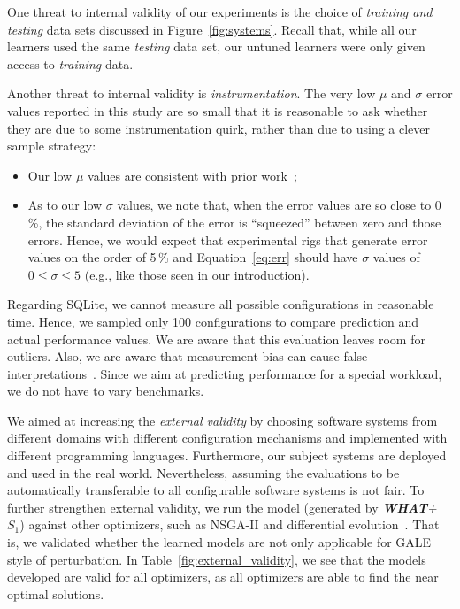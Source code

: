 \documentclass[smallextended]{svjour3}       %
\newcommand{\fig}[1]{Figure~\ref{fig:#1}}
\newcommand{\eq}[1]{Equation~\ref{eq:#1}}
\newcommand{\what}{{\bf WHAT}\xspace}
\begin{document}
One threat to internal validity of our experiments is the choice
of {\em training and testing} data sets discussed in 
\fig{systems}. Recall that, while all our learners used the same
{\em testing} data set, our untuned learners were only given
access to {\em training} data.

Another threat to internal validity  is {\em instrumentation}. The very low $\mu$ and $\sigma$ error values
reported in this study are so small that it is reasonable to ask whether they are due to some instrumentation
quirk, rather than due to using a clever sample strategy:
\begin{itemize}
\item
Our low $\mu$ values are consistent with prior work~\cite{sarkar2015cost};
\item
As to our low $\sigma$ values, we note that, when the  error values are so close to 0\,\%, the standard
deviation of the error is ``squeezed'' between zero and those errors. Hence, we would expect that
experimental rigs
that generate error values on the order of 5\,\% and \eq{err} should have $\sigma$ values of $0\le \sigma \le 5$ (e.g., like those seen in our introduction).
\end{itemize}

Regarding SQLite, we cannot measure all possible configurations in reasonable time. Hence, we sampled only 100 configurations to compare prediction and actual performance values. We are aware that this evaluation leaves room for outliers.
Also, we are aware that measurement bias can cause false interpretations~\cite{me12d}. Since we aim at predicting performance for a special workload, we do not have to vary benchmarks.



  We aimed at increasing the {\em external validity} by choosing software systems from different domains with different configuration mechanisms and implemented with different programming languages. Furthermore, our subject systems  are deployed and used in the real world. Nevertheless, assuming the evaluations to be automatically transferable  to all configurable software systems is not fair. To further strengthen external validity, we run the model (generated by \textit{\what + $S_1$}) against other optimizers, such as NSGA-II and differential evolution~\cite{storn1997differential}. That is, we validated whether the learned models are not only applicable for GALE style of perturbation. In Table~\ref{fig:external_validity}, we see that the models developed are valid for all optimizers, as all optimizers are able to find the near optimal solutions.
\end{document}
